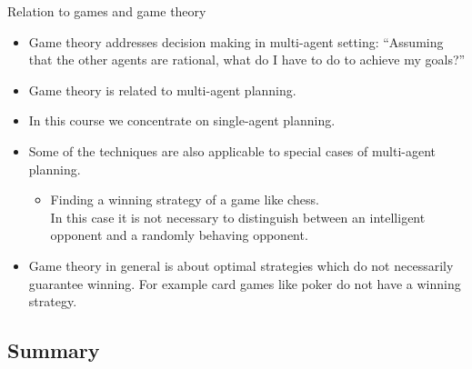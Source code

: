 \documentclass{gkibeamer}
\begin{document}
\begin{frame}{Relation to games and game theory}
  \begin{itemize}
  \item Game theory addresses decision making in multi-agent setting:
    ``Assuming that the other agents are rational, what do I have to
    do to achieve my goals?''
  \item Game theory is related to \alert{multi-agent planning}.
  \item In this course we concentrate on \alert{single-agent
    planning}.
  \item Some of the techniques are also applicable to special cases of
    multi-agent planning.
    \begin{itemize}
    \item {} Finding a \alert{winning strategy} of a
      game like chess. \\ In this case it is not necessary to
      distinguish between \alert{an intelligent opponent} and \alert{a
        randomly behaving opponent}.
    \end{itemize}
  \item Game theory in general is about \alert{optimal strategies}
    which do not necessarily guarantee winning. For example card games
    like poker do not have a winning strategy.
  \end{itemize}
\end{frame}

\subsection{Summary}
\end{document}
